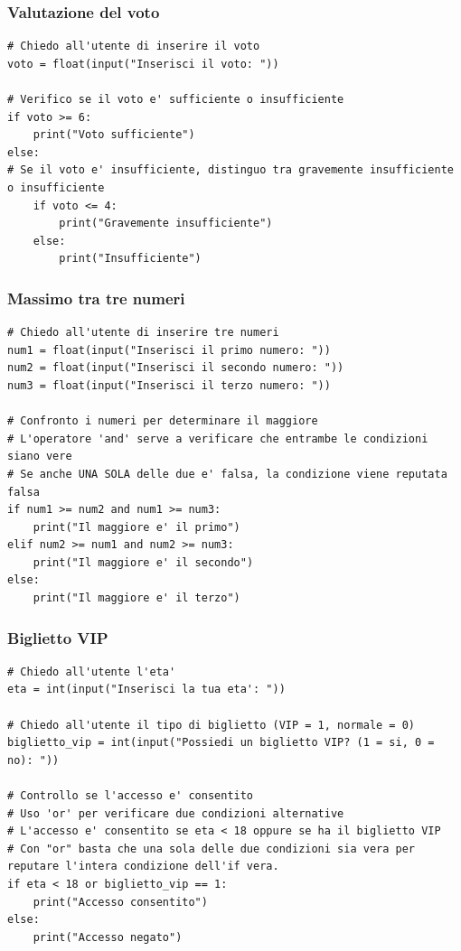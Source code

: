 \documentclass[a4paper,12pt]{article}
\begin{document}
\newpage
\subsubsection{Valutazione del voto}
\begin{lstlisting}
# Chiedo all'utente di inserire il voto
voto = float(input("Inserisci il voto: "))

# Verifico se il voto e' sufficiente o insufficiente
if voto >= 6:
	print("Voto sufficiente")
else:
# Se il voto e' insufficiente, distinguo tra gravemente insufficiente o insufficiente
	if voto <= 4:
		print("Gravemente insufficiente")
	else:
		print("Insufficiente")

\end{lstlisting}


\newpage
\subsubsection{Massimo tra tre numeri}

\begin{lstlisting}
# Chiedo all'utente di inserire tre numeri
num1 = float(input("Inserisci il primo numero: "))
num2 = float(input("Inserisci il secondo numero: "))
num3 = float(input("Inserisci il terzo numero: "))

# Confronto i numeri per determinare il maggiore
# L'operatore 'and' serve a verificare che entrambe le condizioni siano vere
# Se anche UNA SOLA delle due e' falsa, la condizione viene reputata falsa
if num1 >= num2 and num1 >= num3:
	print("Il maggiore e' il primo")
elif num2 >= num1 and num2 >= num3:
	print("Il maggiore e' il secondo")
else:
	print("Il maggiore e' il terzo")

\end{lstlisting}




\newpage
\subsubsection{Biglietto VIP}
\begin{lstlisting}
# Chiedo all'utente l'eta'
eta = int(input("Inserisci la tua eta': "))

# Chiedo all'utente il tipo di biglietto (VIP = 1, normale = 0)
biglietto_vip = int(input("Possiedi un biglietto VIP? (1 = si, 0 = no): "))

# Controllo se l'accesso e' consentito
# Uso 'or' per verificare due condizioni alternative
# L'accesso e' consentito se eta < 18 oppure se ha il biglietto VIP
# Con "or" basta che una sola delle due condizioni sia vera per reputare l'intera condizione dell'if vera.
if eta < 18 or biglietto_vip == 1:
	print("Accesso consentito")
else:
	print("Accesso negato")

\end{lstlisting}
\end{document}
